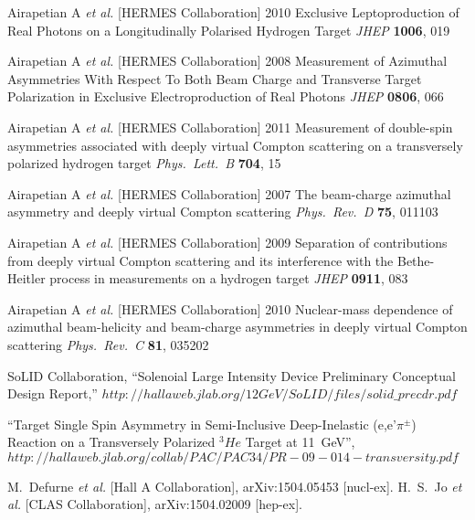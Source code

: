   Airapetian A {\it et al.}  [HERMES Collaboration] 2010
  Exclusive Leptoproduction of Real Photons on a Longitudinally Polarised Hydrogen Target
  {\it JHEP} {\bf 1006}, 019

  Airapetian A {\it et al.}  [HERMES Collaboration] 2008
  Measurement of Azimuthal Asymmetries With Respect To Both Beam Charge and Transverse Target Polarization in Exclusive Electroproduction of Real Photons
  {\it JHEP} {\bf 0806}, 066

  Airapetian A {\it et al.}  [HERMES Collaboration] 2011
  Measurement of double-spin asymmetries associated with deeply virtual Compton scattering on a transversely polarized hydrogen target
  {\it Phys.\ Lett.\ B} {\bf 704}, 15

  Airapetian A {\it et al.}  [HERMES Collaboration] 2007
  The beam-charge azimuthal asymmetry and deeply virtual Compton
  scattering
  {\it Phys.\ Rev.\  D} {\bf 75}, 011103 

  Airapetian A {\it et al.}  [HERMES Collaboration] 2009
  Separation of contributions from deeply virtual Compton scattering and its interference with the Bethe-Heitler process in measurements on a hydrogen target
  {\it JHEP} {\bf 0911}, 083

  Airapetian A {\it et al.}  [HERMES Collaboration] 2010
  Nuclear-mass dependence of azimuthal beam-helicity and beam-charge asymmetries in deeply virtual Compton scattering
  {\it Phys.\ Rev.\ C} {\bf 81}, 035202

  SoLID Collaboration, ``Solenoial Large Intensity Device Preliminary Conceptual Design Report,''
  $http://hallaweb.jlab.org/12GeV/SoLID/files/solid\_precdr.pdf$

  ``Target Single Spin Asymmetry in Semi-Inclusive Deep-Inelastic (e,e'$\pi^{\pm}$) Reaction on a Transversely Polarized $^{3}He$ Target at 11~GeV'',
$http://hallaweb.jlab.org/collab/PAC/PAC34/PR-09-014-transversity.pdf$

  M.~Defurne {\it et al.}  [Hall A Collaboration],
  arXiv:1504.05453 [nucl-ex].
  H.~S.~Jo {\it et al.}  [CLAS Collaboration],
  arXiv:1504.02009 [hep-ex].
